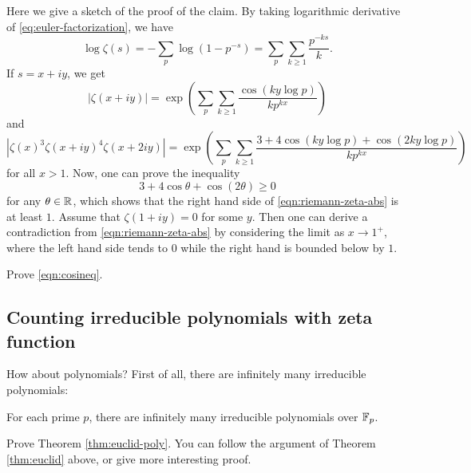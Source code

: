 Here we give a sketch of the proof of the claim.
By taking logarithmic derivative of \eqref{eq:euler-factorization}, we have
\[
\log \zeta(s) = - \sum_p \log(1 - p^{-s}) = \sum_p \sum_{k \ge 1} \frac{p^{-ks}}{k}.
\]
If $s = x + iy$, we get
\[
|\zeta(x + iy)| = \exp\left(\sum_{p} \sum_{k \ge 1} \frac{\cos (ky \log p)}{k p^{kx}}\right)
\]
and
\begin{equation}
\label{eqn:riemann-zeta-abs}
|\zeta(x)^3 \zeta(x + iy)^4 \zeta(x + 2iy)| = \exp\left(\sum_{p} \sum_{k \ge 1} \frac{3 + 4 \cos(k y \log p) + \cos(2 k y \log p)}{k p^{kx}}\right)
\end{equation}
for all $x > 1$.
Now, one can prove the inequality
\begin{equation}
    \label{eqn:cosineq}
    3 + 4 \cos \theta + \cos(2\theta) \ge 0
\end{equation}
for any $\theta \in \mathbb{R}$, which shows that the right hand side of \eqref{eqn:riemann-zeta-abs} is at least $1$.
Assume that $\zeta(1 + iy) = 0$ for some $y$. Then one can derive a contradiction from \eqref{eqn:riemann-zeta-abs} by considering the limit as $x \to 1^+$, where the left hand side tends to $0$ while the right hand is bounded below by $1$.

\begin{exercise}
    Prove \eqref{eqn:cosineq}.
\end{exercise}

\subsection{Counting irreducible polynomials with zeta function}
\label{subsec:counting-irred-poly-zeta}

How about polynomials?
First of all, there are infinitely many irreducible polynomials:
\begin{theorem}
    \label{thm:euclid-poly}
    For each prime $p$, there are infinitely many irreducible polynomials over $\mathbb{F}_p$.
\end{theorem}

\begin{exercise}
    Prove Theorem \ref{thm:euclid-poly}. You can follow the argument of Theorem \ref{thm:euclid} above, or give more interesting proof.
\end{exercise}

